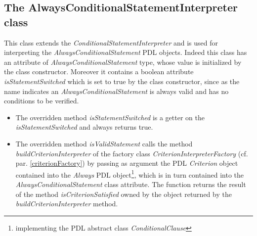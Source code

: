 \documentclass[a4paper,11pt] {ivoa}
\begin{document}
\subsection{The AlwaysConditionalStatementInterpreter class}
This class extends the {\it ConditionalStatementInterpreter} and is used for interpreting the {\it AlwaysConditionalStatement} PDL objects. Indeed this class has an attribute of {\it AlwaysConditionalStatement} type, whose value is initialized by the class constructor. Moreover it contains a boolean attribute {\it isStatementSwitched} which is set to true by the class constructor, since as the name indicates an {\it AlwaysConditionalStatement} is always valid and has no conditions to be verified.\\
\begin{itemize}
\item The overridden method {\it isStatementSwitched} is a getter on the  {\it isStatementSwitched} and always returns true.
\item The overridden method {\it isValidStatement} calls the method {\it buildCriterionInterpreter} of the factory class {\it CriterionInterpreterFactory} (cf. par. \ref{criterionFactory}) by passing as argument the PDL {\it Criterion} object contained into the {\it Always} PDL object\footnote{implementing the PDL abstract class {\it ConditionalClause}}, which is in turn contained into the {\it AlwaysConditionalStatement} class attribute. The function returns the result of the method {\it isCriterionSatisfied} owned by the object returned by the {\it buildCriterionInterpreter} method.
\end{itemize}
\end{document}

